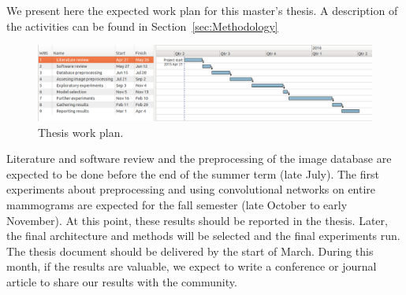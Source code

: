 We present here the expected work plan for this master's thesis. A description of the activities can be found in Section~\ref{sec:Methodology}
\begin{figure}[h]
	\centering
	\includegraphics[width = \textwidth]{plots/workplan.png}
	\caption[Thesis Work Plan]{Thesis work plan.}
	\label{fig:workplan}
\end{figure}

Literature and software review and the preprocessing of the image database are expected to be done before the end of the summer term (late July). The first experiments about preprocessing and using convolutional networks on entire mammograms are expected for the fall semester (late October to early November). At this point, these results should be reported in the thesis. Later, the final architecture and methods will be selected and the final experiments run. The thesis document should be delivered by the start of March. During this month, if the results are valuable, we expect to write a conference or journal article to share our results with the community.

